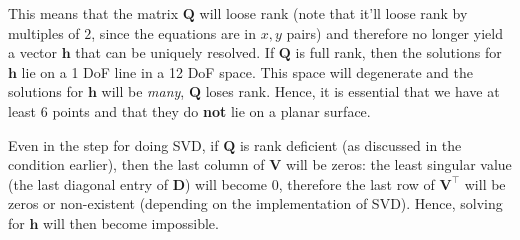 This means that the matrix $\mathbf{Q}$ will loose rank (note that it'll loose rank by multiples of $2$, since the equations are in $x, y$ pairs) and therefore no longer yield a vector $\mathbf{h}$ that can be uniquely resolved. If $\mathbf{Q}$ is full rank, then the solutions for $\mathbf{h}$ lie on a 1 DoF line in a 12 DoF space. This space will degenerate and the solutions for $\mathbf{h}$ will be \textit{many}, $\mathbf{Q}$ loses rank. Hence, it is essential that we have at least 6 points and that they do \textbf{not} lie on a planar surface.

Even in the step for doing SVD, if $\mathbf{Q}$ is rank deficient (as discussed in the condition earlier), then the last column of $\mathbf{V}$ will be zeros: the least singular value (the last diagonal entry of $\mathbf{D}$) will become $0$, therefore the last row of $\mathbf{V}^\top$ will be zeros or non-existent (depending on the implementation of SVD). Hence, solving for $\mathbf{h}$ will then become impossible.
